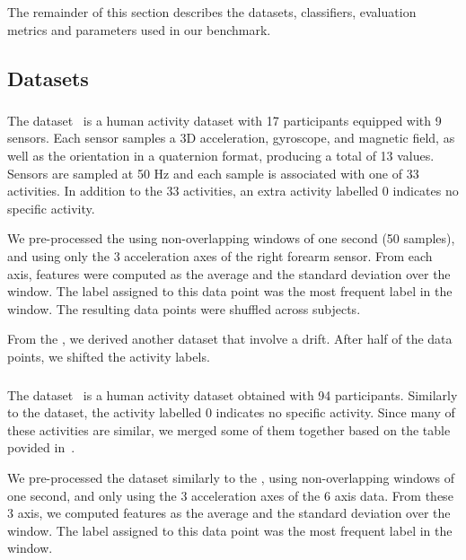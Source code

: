 The remainder of this section describes the datasets, classifiers,
evaluation metrics and parameters used in our benchmark.

\subsection{Datasets}
\subsubsection{\banosdataset}
The \banosdataset dataset~\cite{Banos_2014} is a human
activity dataset with 17 participants
equipped with 9 sensors. Each sensor samples a 3D
acceleration, gyroscope, and magnetic field, as well as 
the orientation in a quaternion format, producing a total of 13 values.
Sensors are
sampled at 50 Hz and each sample is associated
with one of 33 activities. In
addition to the 33 activities, an extra activity
labelled 0 indicates no specific activity.

We pre-processed the \banosdataset using
non-overlapping windows of one second (50
samples), and using only the 3 acceleration axes of the
right forearm sensor. From each axis, features were computed as the
average and the standard deviation over the window. The label assigned to this data
point was the most frequent label in the window.
The resulting data points were shuffled
across subjects.

From the \banosdataset, we derived another dataset
that involve a drift. After half of the data
points, we shifted the activity labels.

\subsubsection{\recofitdataset}
The \recofitdataset dataset~\cite{recofit} is a
human activity dataset obtained with 94
participants. Similarly to the \banosdataset
dataset, the activity labelled 0 indicates no
specific activity.
Since many of these activities are similar, we
merged some of them together based on the table
povided in~\cite{behzad2019}. 

We pre-processed the dataset similarly to the
\banosdataset, using non-overlapping windows of
one second, and only using the 3 acceleration axes
of the 6 axis data. From these 3 axis, we computed
features as the average and the standard deviation
over the window. The label assigned to this data
point was the most frequent label in the window.

